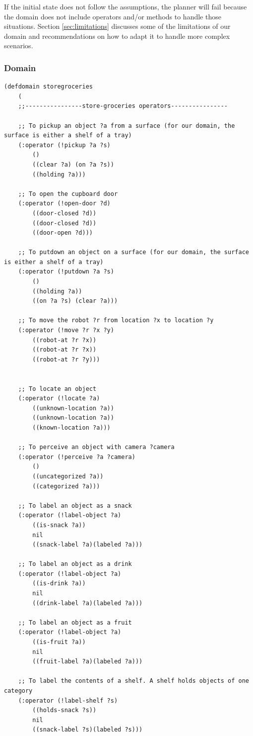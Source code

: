 \documentclass[paper=a4, fontsize=11pt]{scrartcl}
\begin{document}
	If the initial state does not follow the assumptions, the planner will fail because the domain does not include operators and/or methods to handle those situations. Section \ref{sec:limitations} discusses some of the limitations of our domain and recommendations on how to adapt it to handle more complex scenarios.
	
	\subsubsection*{Domain}
	
	\begin{lstlisting}		
(defdomain storegroceries
	(
	;;----------------store-groceries operators----------------
	
	;; To pickup an object ?a from a surface (for our domain, the surface is either a shelf of a tray)
	(:operator (!pickup ?a ?s)
		()
		((clear ?a) (on ?a ?s))
		((holding ?a)))
	
	;; To open the cupboard door
	(:operator (!open-door ?d)
		((door-closed ?d))
		((door-closed ?d))
		((door-open ?d)))
	
	;; To putdown an object on a surface (for our domain, the surface is either a shelf of a tray)
	(:operator (!putdown ?a ?s)
		()
		((holding ?a))
		((on ?a ?s) (clear ?a)))
	
	;; To move the robot ?r from location ?x to location ?y
	(:operator (!move ?r ?x ?y)
		((robot-at ?r ?x))
		((robot-at ?r ?x))
		((robot-at ?r ?y)))


	;; To locate an object
	(:operator (!locate ?a)
		((unknown-location ?a))
		((unknown-location ?a))
		((known-location ?a)))
	
	;; To perceive an object with camera ?camera
	(:operator (!perceive ?a ?camera)
		()
		((uncategorized ?a))
		((categorized ?a)))
	
	;; To label an object as a snack
	(:operator (!label-object ?a)
		((is-snack ?a))
		nil
		((snack-label ?a)(labeled ?a)))
		
	;; To label an object as a drink
	(:operator (!label-object ?a)
		((is-drink ?a))
		nil
		((drink-label ?a)(labeled ?a)))

	;; To label an object as a fruit
	(:operator (!label-object ?a)
		((is-fruit ?a))
		nil
		((fruit-label ?a)(labeled ?a)))
	
	;; To label the contents of a shelf. A shelf holds objects of one category
	(:operator (!label-shelf ?s)
		((holds-snack ?s))
		nil
		((snack-label ?s)(labeled ?s)))
	

\end{lstlisting}
\end{document}
